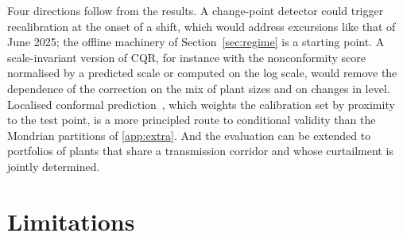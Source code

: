 Four directions follow from the results. A change-point detector could trigger recalibration at the onset of a shift, which would address excursions like that of June 2025; the offline machinery of Section~\ref{sec:regime} is a starting point. A scale-invariant version of CQR, for instance with the nonconformity score normalised by a predicted scale or computed on the log scale, would remove the dependence of the correction on the mix of plant sizes and on changes in level. Localised conformal prediction~\cite{guan2022}, which weights the calibration set by proximity to the test point, is a more principled route to conditional validity than the Mondrian partitions of \ref{app:extra}. And the evaluation can be extended to portfolios of plants that share a transmission corridor and whose curtailment is jointly determined.

\section{Limitations}
\label{sec:limitations}

